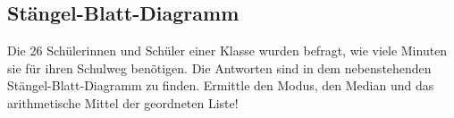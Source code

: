 \subsection{Stängel-Blatt-Diagramm}

Die 26 Schülerinnen und Schüler einer Klasse wurden
befragt, wie viele Minuten sie für ihren Schulweg
benötigen. Die Antworten sind in dem nebenstehenden Stängel-Blatt-Diagramm zu finden.
Ermittle den Modus, den Median und das arithmetische Mittel der geordneten Liste!


\hfill \break
\fboxrule=0.8pt \\
